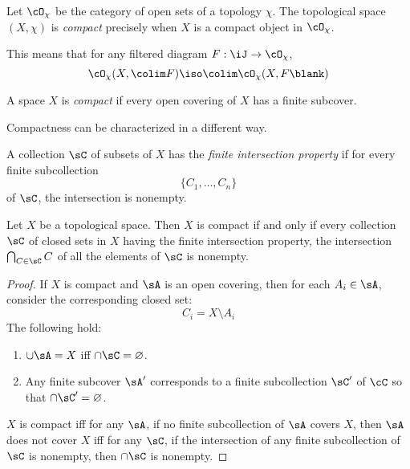 \documentclass{amsart}
\begin{document}
\begin{defn}
  Let $\cO_{\chi}$ be the category of open sets of a topology $\chi$.
  The topological space $(X, \chi)$ is \emph{compact} precisely when $X$ is a compact object in $\cO_{\chi}$.
\end{defn}

This means that for any filtered diagram $F : \iJ \to \cO_{\chi}$,
\[
  \cO_{\chi}(X,\colim F) \iso \colim\cO_{\chi}(X, F\blank)
\]

\begin{defn}
  A space $X$ is \emph{compact} if every open covering of $X$ has a finite subcover.
\end{defn}

Compactness can be characterized in a different way.

\begin{defn}
  A collection $\sC$ of subsets of $X$ has the \emph{finite intersection property} if for every finite subcollection
  \[
    \{C_{1},\ldots,C_{n}\}
  \]
  of $\sC$, the intersection is nonempty.
\end{defn}

\begin{thm}
  Let $X$ be a topological space.
  Then $X$ is compact if and only if every collection $\sC$ of closed sets in $X$ having the finite intersection property, the intersection $\bigcap_{C \in \sC}C$ of all the elements of $\sC$ is nonempty.
\end{thm}
\begin{proof}
  If $X$ is compact and $\sA$ is an open covering, then for each $A_{i} \in \sA$, consider the corresponding closed set:
  \[
    C_{i} = X \setminus A_{i}
  \]
  The following hold:
  \begin{enumerate}
  \item $\cup\sA = X$ iff $\cap\sC = \varnothing$.
  \item Any finite subcover $\sA'$ corresponds to a finite subcollection $\sC'$ of $\cC$ so that $\cap\sC' = \varnothing$.
  \end{enumerate}
  $X$ is compact iff for any $\sA$, if no finite subcollection of $\sA$ covers $X$, then $\sA$ does not cover $X$ iff for any $\sC$, if the intersection of any finite subcollection of $\sC$ is nonempty, then $\cap\sC$ is nonempty.
\end{proof}
\end{document}
